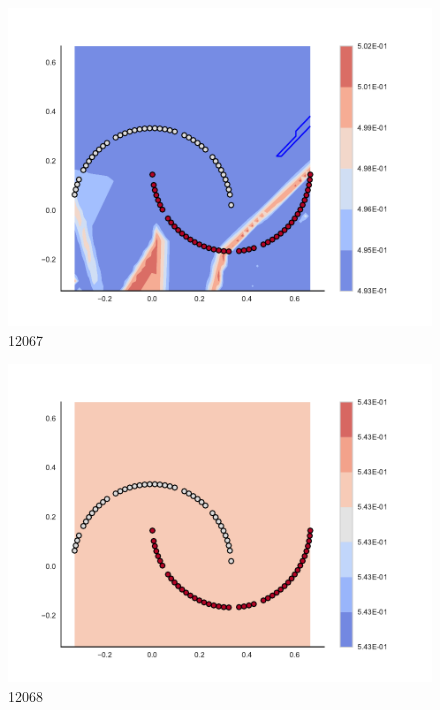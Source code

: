 \begin{subfigure}[b]{0.09\textwidth}
    \includegraphics[clip, trim=2.35cm 1.75cm 4.5cm 0cm,width=\textwidth]{img/convergence/12067.pdf}
    \caption{12067}
    \label{fig:convergence_12067}
\end{subfigure}
%
\begin{subfigure}[b]{0.09\textwidth}
    \includegraphics[clip, trim=2.35cm 1.75cm 4.5cm 0cm,width=\textwidth]{img/convergence/12068.pdf}
    \caption{12068}
    \label{fig:convergence_12068}
\end{subfigure}
%
